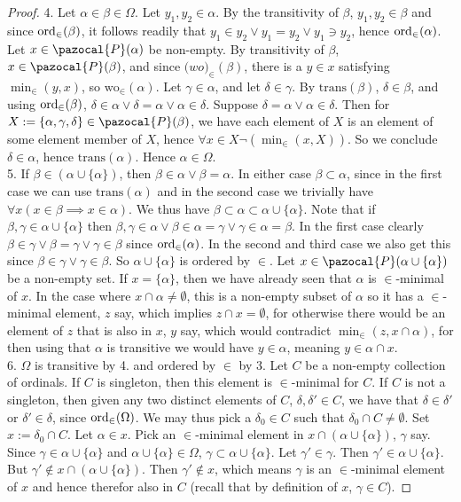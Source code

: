\begin{proof}
    4. Let $\alpha\in \beta \in \Omega$. Let $y_1,y_2\in \alpha$. By the transitivity of $\beta$, $y_1,y_2\in\beta$ and since $\mathrm{ord}_\in(\beta)$, it follows readily that $y_1\in y_2\vee y_1=y_2\vee y_1\ni y_2$, hence $\mathrm{ord}_\in(\alpha)$. Let $x\in \pazocal{P}(\alpha)$ be non-empty. By transitivity of $\beta$, $x\in\pazocal{P}(\beta)$, and since $\mathrm(wo)_\in(\beta)$, there is a $y\in x$ satisfying $\min_\in(y,x)$, so $\mathrm{wo}_\in(\alpha)$. Let $\gamma\in \alpha$, and let $\delta\in \gamma$. By $\mathrm{trans}(\beta)$, $\delta\in \beta$, and using $\mathrm{ord}_\in(\beta)$, $\delta\in \alpha\vee \delta = \alpha\vee \alpha\in \delta$. Suppose $\delta=\alpha\vee \alpha\in \delta$. Then for $X:=\{\alpha,\gamma,\delta\}\in\pazocal{P}(\beta)$, we have each element of $X$ is an element of some element member of $X$, hence $\forall x \in X \neg(\min_\in(x,X))$. So we conclude $\delta\in \alpha$, hence $\mathrm{trans}(\alpha)$. Hence $\alpha\in \Omega$.\\
    5. If $\beta\in (\alpha\cup\{\alpha\})$, then $\beta\in \alpha\vee \beta = \alpha$. In either case $\beta\subset \alpha$, since in the first case we can use $\mathrm{trans}(\alpha)$ and in the second case we trivially have $\forall x(x\in \beta \implies x\in \alpha)$. We thus have $\beta\subset \alpha\subset \alpha\cup \{\alpha\}$. Note that if $\beta,\gamma\in \alpha\cup\{\alpha\}$ then $\beta,\gamma\in \alpha \vee \beta \in \alpha=\gamma \vee  \gamma\in \alpha=\beta$. In the first case clearly $\beta\in \gamma \vee \beta = \gamma \vee \gamma\in \beta$ since $\mathrm{ord}_\in(\alpha)$. In the second and third case we also get this since $\beta \in \gamma \vee \gamma\in \beta$. So $\alpha\cup\{\alpha\}$ is ordered by $\in$. Let $x\in\pazocal{P}(\alpha\cup\{\alpha\})$ be a non-empty set. If $x=\{\alpha\}$, then we have already seen that $\alpha$ is $\in$-minimal of $x$. In the case where $x\cap \alpha \neq \emptyset$, this is a non-empty subset of $\alpha$ so it has a $\in$-minimal element, $z$ say, which implies $z\cap x = \emptyset$, for otherwise there would be an element of $z$ that is also in $x$, $y$ say, which would contradict $\min_\in(z,x\cap \alpha)$, for then using that $\alpha$ is transitive we would have $y\in \alpha$, meaning $y\in \alpha \cap x$.\\
    6. $\Omega$ is transitive by 4. and ordered by $\in$ by 3. Let $C$ be a non-empty collection of ordinals. If $C$ is singleton, then this element is $\in$-minimal for $C$. If $C$ is not a singleton, then given any two distinct elements of $C$, $\delta,\delta'\in C$, we have that $\delta\in \delta'$ or $\delta'\in \delta$, since $\mathrm{ord}_\in(\Omega)$. We may thus pick a $\delta_0\in C$ such that $\delta_0\cap C\neq \emptyset$. Set $x:= \delta_0\cap C$. Let $\alpha\in x$. Pick an $\in$-minimal element in $x\cap (\alpha \cup\{\alpha\})$, $\gamma$ say. Since $\gamma\in \alpha\cup\{\alpha\}$ and $\alpha\cup\{\alpha\}\in \Omega$, $\gamma\subset \alpha\cup \{\alpha\}$.  Let $\gamma'\in \gamma$. Then $\gamma'\in \alpha\cup \{\alpha\}$. But $\gamma'\notin x\cap (\alpha\cup\{\alpha\})$. Then $\gamma'\notin x$, which means $\gamma$ is an $\in$-minimal element of $x$ and hence therefor also in $C$ (recall that by definition of $x$, $\gamma\in C$). 
\end{proof}
